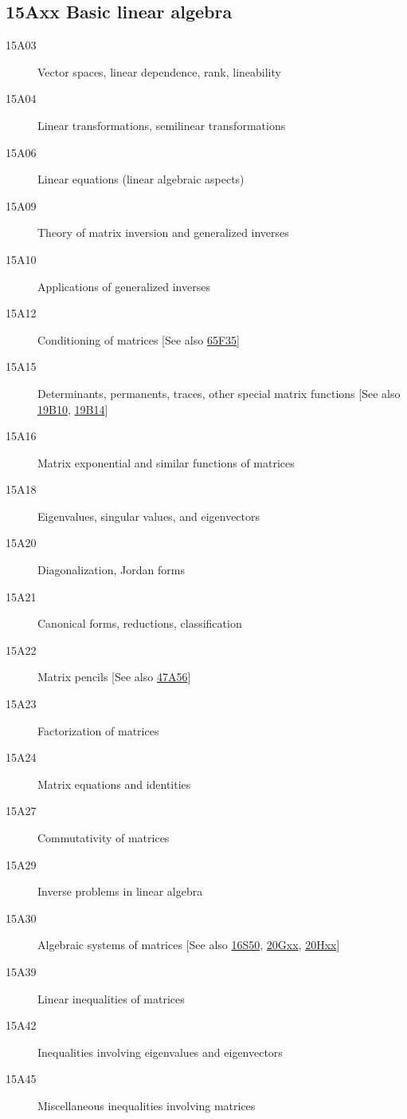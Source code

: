 \documentclass[letterpaper]{article}
\begin{document}
\subsection*{15Axx  Basic linear algebra }\label{15Axx}
\begin{description}  
\item [15A03]\label{15A03} Vector spaces, linear dependence, rank, lineability
\item [15A04]\label{15A04} Linear transformations, semilinear transformations
\item [15A06]\label{15A06} Linear equations (linear algebraic aspects)
\item [15A09]\label{15A09} Theory of matrix inversion and generalized inverses
\item [15A10]\label{15A10} Applications of generalized inverses
\item [15A12]\label{15A12} Conditioning of matrices [See also \hyperref[65F35]{65F35}]
\item [15A15]\label{15A15} Determinants, permanents, traces, other special matrix functions [See also \hyperref[19B10]{19B10}, \hyperref[19B14]{19B14}]
\item [15A16]\label{15A16} Matrix exponential and similar functions of matrices
\item [15A18]\label{15A18} Eigenvalues, singular values, and eigenvectors
\item [15A20]\label{15A20} Diagonalization, Jordan forms
\item [15A21]\label{15A21} Canonical forms, reductions, classification
\item [15A22]\label{15A22} Matrix pencils [See also \hyperref[47A56]{47A56}]
\item [15A23]\label{15A23} Factorization of matrices
\item [15A24]\label{15A24} Matrix equations and identities
\item [15A27]\label{15A27} Commutativity of matrices
\item [15A29]\label{15A29} Inverse problems in linear algebra
\item [15A30]\label{15A30} Algebraic systems of matrices [See also \hyperref[16S50]{16S50}, \hyperref[20Gxx]{20Gxx}, \hyperref[20Hxx]{20Hxx}]
\item [15A39]\label{15A39} Linear inequalities of matrices
\item [15A42]\label{15A42} Inequalities involving eigenvalues and eigenvectors
\item [15A45]\label{15A45} Miscellaneous inequalities involving matrices

\end{description}
\end{document}

